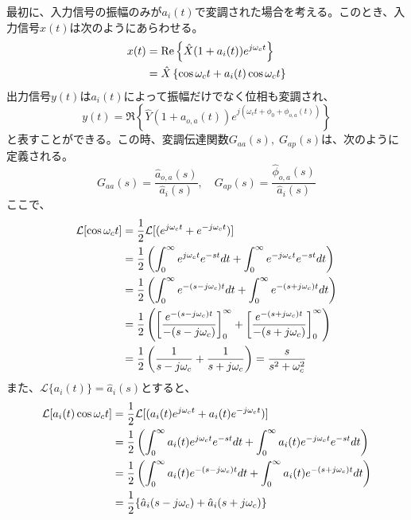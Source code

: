 \documentclass[book]{jlreq}
\begin{document}
最初に、入力信号の振幅のみが$a_i(t)$で変調された場合を考える。このとき、入力信号$x(t)$は次のようにあらわせる。
%
\begin{align}
    x(t) & = \Re\left \{\hat{X}(1 + a_i(t))e^{j\omega_c t}\right \}\notag   \\
         & = \hat{X}\left \{\cos\omega_c t + a_i(t) \cos\omega_c t\right \}
    \label{eq:in_am_sig1}
\end{align}
%
出力信号$y(t)$は$a_i(t)$によって振幅だけでなく位相も変調され、
%
\begin{equation}
    y(t) = \Re\left \{\hat{Y}(1 + a_{o,a}(t))e^{j(\omega_c t + \phi_0 + \phi_{o,a} (t))}\right \}
    \label{eq:out_am_sig1}
\end{equation}
%
と表すことができる。この時、変調伝達関数$G_{aa}(s),\;G_{ap}(s)$は、次のように定義される。
%
\begin{equation}
    G_{aa}(s) =  \frac{\hat{a}_{o, a}(s)}{\hat{a}_i(s)}, \quad G_{ap}(s) =  \frac{\hat{\phi}_{o, a}(s)}{\hat{a}_i(s)}
    \label{eq:am_tf}
\end{equation}
%
ここで、
%
\begin{align}
    \mathcal{L} [\cos\omega_c t]
     & = \frac{1}{2}\mathcal{L}[(e^{j\omega_c t}+e^{-j\omega_c t})]\notag                                                    \\
     & = \frac{1}{2}\left(\int_0^\infty e^{j\omega_c t} e^{-st} dt + \int_0^\infty e^{-j\omega_c t} e^{-st} dt \right)\notag \\
     & = \frac{1}{2}\left(\int_0^\infty e^{-(s-j\omega_c) t} dt + \int_0^\infty e^{-(s+j\omega_c) t} dt \right)\notag        \\
     & = \frac{1}{2}\left(\left[\frac{e^{-(s-j\omega_c) t}}{-(s-j\omega_c)}\right]_0^\infty +
    \left[\frac{e^{-(s+j\omega_c) t}}{-(s+j\omega_c)}\right]_0^\infty \right)\notag                                          \\
     & = \frac{1}{2}\left( \frac{1}{s-j\omega_c}+\frac{1}{s+j\omega_c}\right)
    = \frac{s}{s^2+\omega_c^2}
\end{align}
%
また、$\mathcal{L}\{a_i(t)\} = \hat{a}_i(s)$とすると、
%
\begin{align}
    \mathcal{L} [a_i(t)\cos\omega_c t]
     & = \frac{1}{2}\mathcal{L}[(a_i(t) e^{j\omega_c t}+a_i(t) e^{-j\omega_c t})]\notag                                                    \\
     & = \frac{1}{2}\left(\int_0^\infty a_i(t) e^{j\omega_c t} e^{-st} dt + \int_0^\infty a_i(t) e^{-j\omega_c t} e^{-st} dt \right)\notag \\
     & = \frac{1}{2}\left(\int_0^\infty a_i(t) e^{-(s-j\omega_c) t} dt + \int_0^\infty a_i(t) e^{-(s+j\omega_c) t} dt \right)\notag        \\
     & = \frac{1}{2}\{\hat{a}_i(s-j\omega_c) + \hat{a}_i(s+j\omega_c)\}
\end{align}
\end{document}
